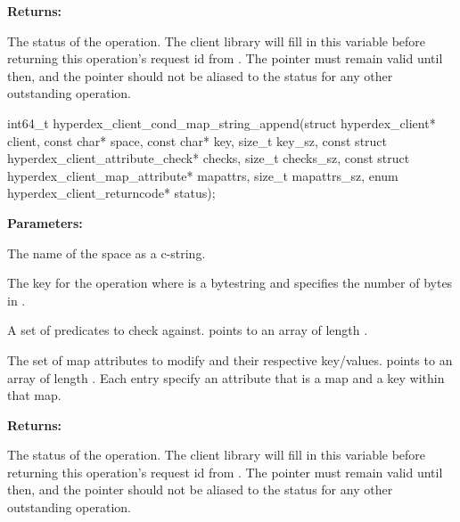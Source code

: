 \noindent\textbf{Returns:}
\begin{description}[labelindent=\widthof{{\code{status}}},leftmargin=*,noitemsep,nolistsep,align=right]
\item[\code{status}] The status of the operation.  The client library will fill in this variable before returning this operation's request id from .  The pointer must remain valid until then, and the pointer should not be aliased to the status for any other outstanding operation.
\end{description}

\funcsep
{}
\begin{ccode}
int64_t hyperdex_client_cond_map_string_append(struct hyperdex_client* client,
                const char* space,
                const char* key, size_t key_sz,
                const struct hyperdex_client_attribute_check* checks, size_t checks_sz,
                const struct hyperdex_client_map_attribute* mapattrs, size_t mapattrs_sz,
                enum hyperdex_client_returncode* status);
\end{ccode}
\funcdesc 

\noindent\textbf{Parameters:}
\begin{description}[labelindent=\widthof{{\code{mapattrs}, \code{mapattrs\_sz}}},leftmargin=*,noitemsep,nolistsep,align=right]
\item[\code{space}] The name of the space as a c-string.
\item[\code{key}, \code{key\_sz}] The key for the operation where  is a bytestring and  specifies the number of bytes in .
\item[\code{checks}, \code{checks\_sz}] A set of predicates to check against.   points to an array of length .
\item[\code{mapattrs}, \code{mapattrs\_sz}] The set of map attributes to modify and their respective key/values.   points to an array of length .  Each entry specify an attribute that is a map and a key within that map.
\end{description}

\noindent\textbf{Returns:}
\begin{description}[labelindent=\widthof{{\code{status}}},leftmargin=*,noitemsep,nolistsep,align=right]
\item[\code{status}] The status of the operation.  The client library will fill in this variable before returning this operation's request id from .  The pointer must remain valid until then, and the pointer should not be aliased to the status for any other outstanding operation.
\end{description}


